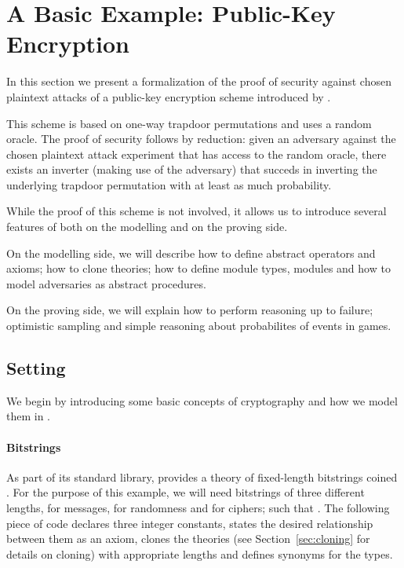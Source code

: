 \section{A Basic Example: Public-Key Encryption\label{sec:tutorial}}
In this section we present a formalization of the proof of security
against chosen plaintext attacks of a public-key encryption scheme
introduced by \citet{br93}.

This scheme is based on one-way trapdoor permutations and uses a
random oracle. The proof of security follows by reduction: given an
adversary against the chosen plaintext attack experiment that has
access to the random oracle, there exists an inverter (making use of
the adversary) that succeds in inverting the underlying trapdoor
permutation with at least as much probability.

While the proof of this scheme is not involved, it allows us to
introduce several features of \EasyCrypt both on the modelling and on
the proving side.

On the modelling side, we will describe how to define abstract operators
and axioms; how to clone theories; how to define module types, modules
and how to model adversaries as abstract procedures.

On the proving side, we will explain how to perform reasoning up to
failure; optimistic sampling and simple reasoning about probabilites
of events in games.

\subsection{Setting}
We begin by introducing some basic concepts of cryptography and how we
model them in \EasyCrypt.

\paragraph{Bitstrings}
As part of its standard library, \EasyCrypt provides a theory of fixed-length
bitstrings coined . For the purpose of this example, we will
need bitstrings of three different lengths,  for messages,
 for randomness and  for ciphers; such that . The following piece of code declares three integer constants,
states the desired relationship between them as an axiom, clones the
theories (see Section~\ref{sec:cloning} for details on cloning) with
appropriate lengths and defines synonyms for the types.


